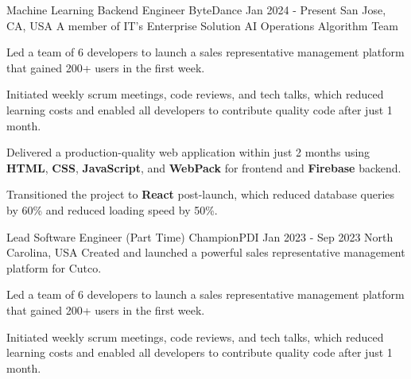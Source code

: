 
\begin{cventries}
  \cventry
    {Machine Learning Backend Engineer} %
    {ByteDance} %
    {Jan 2024 - Present} %
    {San Jose, CA, USA} %
    {A member of IT's Enterprise Solution AI Operations Algorithm Team}
    {
      \begin{cvitems} %
        \item {Led a team of 6 developers to launch a sales representative management platform that gained 200+ users in the first week.}
        \item {Initiated weekly scrum meetings, code reviews, and tech talks, which reduced learning costs and enabled all developers to contribute quality code after just 1 month.}
        \item {Delivered a production-quality web application within just 2 months using \textbf{HTML}, \textbf{CSS}, \textbf{JavaScript}, and \textbf{WebPack} for frontend and \textbf{Firebase} backend.}
        \item {Transitioned the project to \textbf{React} post-launch, which reduced database queries by 60\% and reduced loading speed by 50\%.}
      \end{cvitems}
    }
  \cventry
    {Lead Software Engineer (Part Time)} %
    {ChampionPDI} %
    {Jan 2023 - Sep 2023} %
    {North Carolina, USA} %
    {Created and launched a powerful sales representative management platform for Cutco.}
    {
      \begin{cvitems} %
        \item {Led a team of 6 developers to launch a sales representative management platform that gained 200+ users in the first week.}
        \item {Initiated weekly scrum meetings, code reviews, and tech talks, which reduced learning costs and enabled all developers to contribute quality code after just 1 month.}

\end{cvitems}}
\end{cventries}
